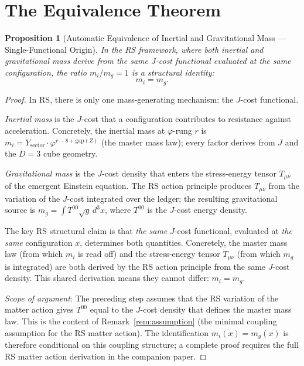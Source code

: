 \documentclass[12pt,a4paper]{article}
\newtheorem{proposition}[theorem]{Proposition}
\theoremstyle{definition}
\theoremstyle{remark}
\begin{document}
\section{The Equivalence Theorem}
\label{sec:equivalence}

\begin{proposition}[Automatic Equivalence of Inertial and
Gravitational Mass --- Single-Functional Origin]
\label{thm:equiv}
In the RS framework, where both inertial and gravitational mass derive
from the same $J$-cost functional evaluated at the same configuration,
the ratio $m_i/m_g = 1$ is a structural identity:
\begin{equation}
  \boxed{m_i = m_g.}
\end{equation}
\end{proposition}

\begin{proof}
In RS, there is only one mass-generating mechanism: the $J$-cost
functional.

\emph{Inertial mass} is the $J$-cost that a configuration
contributes to resistance against acceleration.  Concretely, the
inertial mass at $\varphi$-rung $r$ is
$m_i = Y_{\mathrm{sector}} \cdot \varphi^{r - 8 + \mathrm{gap}(Z)}$
(the master mass law); every factor derives from $J$ and the
$D = 3$ cube geometry.

\emph{Gravitational mass} is the $J$-cost density that enters the
stress-energy tensor $T_{\mu\nu}$ of the emergent Einstein equation.
The RS action principle produces $T_{\mu\nu}$ from the variation
of the $J$-cost integrated over the ledger; the resulting
gravitational source is $m_g = \int T^{00}\sqrt{g}\,d^3x$, where
$T^{00}$ is the $J$-cost energy density.

The key RS structural claim is that \emph{the same} $J$-cost
functional, evaluated at \emph{the same} configuration $x$, determines
both quantities.  Concretely, the master mass law (from which $m_i$
is read off) and the stress-energy tensor $T_{\mu\nu}$ (from which
$m_g$ is integrated) are both derived by the RS action principle from
the same $J$-cost density.  This shared derivation means they
cannot differ: $m_i = m_g$.

\emph{Scope of argument}: The preceding step assumes that the RS
variation of the matter action gives $T^{00}$ equal to the $J$-cost
density that defines the master mass law.  This is the content of
Remark~\ref{rem:assumption} (the minimal coupling assumption for the
RS matter action).  The identification $m_i(x) = m_g(x)$ is therefore
conditional on this coupling structure; a complete proof requires the
full RS matter action derivation in the companion paper.
\end{proof}
\end{document}
